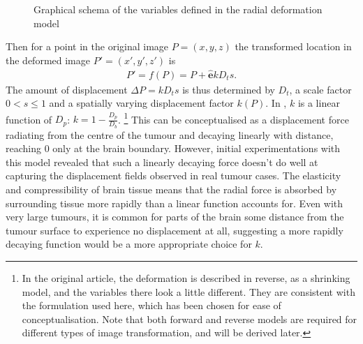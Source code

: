 \begin{figure}[htp]
  \centering
  
  \caption[Tumour deformation model variables]{Graphical schema of the variables defined in the radial deformation model}
  \label{fig:virtue}
\end{figure}

Then for a point in the original image $P = (x,y,z)$ the transformed location in the deformed image $P' = (x',y',z')$ is
\begin{align}\label{eq:forwardP}
  P' = f(P) = P + \mathbf{\hat{e}}kD_ts.
\end{align}
The amount of displacement $\Delta P = kD_ts$ is thus determined by $D_t$, a scale factor $0<s \leq 1$ and a spatially varying displacement factor $k(P)$.
In \textcite{Nowinski2005}, $k$ is a linear function of $D_p$: $k = 1-\frac{D_p}{D_b}$. \footnote[2]{In the original \textcite{Nowinski2005} article, the deformation is described in reverse, as a shrinking model, and the variables there look a little different. They are consistent with the formulation used here, which has been chosen for ease of conceptualisation. Note that both forward and reverse models are required for different types of image transformation, and will be derived later.}
This can be conceptualised as a displacement force radiating from the centre of the tumour and decaying linearly with distance, reaching 0 only at the brain boundary.
However, initial experimentations with this model revealed that such a linearly decaying force doesn't do well at capturing the displacement fields observed in real tumour cases.
The elasticity and compressibility of brain tissue means that the radial force is absorbed by surrounding tissue more rapidly than a linear function accounts for.
Even with very large tumours, it is common for parts of the brain some distance from the tumour surface to experience no displacement at all, suggesting a  more rapidly decaying function would be a more appropriate choice for $k$.

